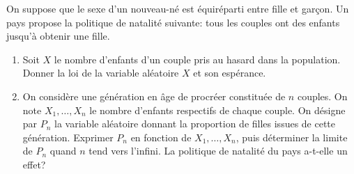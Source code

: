 \begin{td-exo}[]
    On suppose que le sexe d'un nouveau-né est équiréparti entre fille et
    garçon. Un pays propose la politique de natalité suivante:
    tous les couples ont des enfants jusqu'à obtenir une fille.
    \begin{enumerate}
        \item Soit \(X\) le nombre d'enfants d'un couple pris au hasard
        dans la population. Donner la loi de la variable aléatoire \(X\)
        et son espérance.

        \item On considère une génération en âge de procréer constituée
        de \(n\) couples. On note \(X_1,\ldots,X_n\) le nombre d'enfants
        respectifs de chaque couple. On désigne par \(P_n\) la variable
        aléatoire donnant la proportion de filles issues de cette génération.
        Exprimer \(P_n\) en fonction de \(X_1,\ldots,X_n\), puis déterminer
        la limite de \(P_n\) quand \(n\) tend vers l'infini. La politique
        de natalité du pays a-t-elle un effet?
    \end{enumerate}
\end{td-exo}

